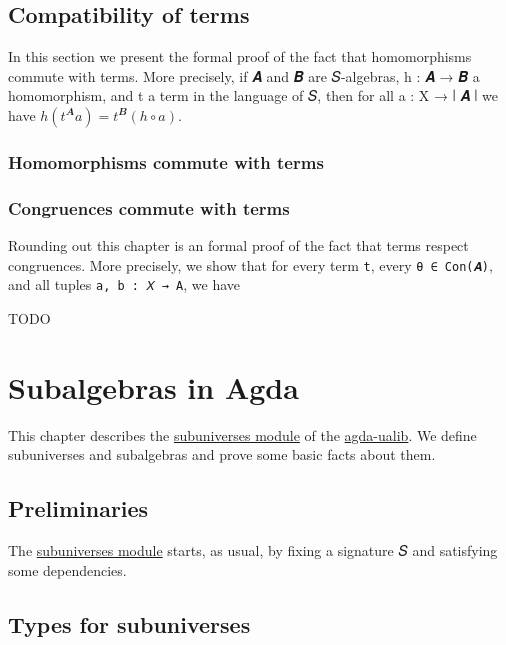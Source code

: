 \documentclass[sigplan,screen]{acmart}
\newcommand{\agdaualib}{\href{https://ualib.org}{agda-ualib}\xspace}
\newcommand\subuniversesmodule{\href{https://gitlab.com/ualib/ualib.gitlab.io/-/blob/master/subuniverses.lagda.rst}{subuniverses module}\xspace}
\begin{document}
\subsection{Compatibility of terms}\label{compatibility-of-terms}
In this section we present the formal proof of the fact that homomorphisms commute with terms. More precisely, if 𝑨 and 𝑩 are 𝑆-algebras, h : 𝑨 → 𝑩 a homomorphism, and t a term in the language of 𝑆, then for all a : X → ∣ 𝑨 ∣ we have \(h (t^{𝑨} a) = t^{𝑩} (h ∘ a)\).

\subsubsection{Homomorphisms commute with terms}\label{homomorphisms-commute-with-terms}
\begin{code}\end{code}

\subsubsection{Congruences commute with terms}\label{congruences-commute-with-terms}
Rounding out this chapter is an formal proof of the fact that terms respect congruences. More precisely, we show that for every term \texttt{t}, every \texttt{θ\ ∈\ Con(𝑨)}, and all tuples \texttt{a,\ b\ :\ 𝑋\ →\ A}, we have

TODO

\section{Subalgebras in Agda}\label{subalgebras-in-agda}
This chapter describes the \subuniversesmodule of the \agdaualib. We define subuniverses and subalgebras and prove some basic facts about them.

\subsection{Preliminaries}\label{preliminaries}
The \subuniversesmodule starts, as usual, by fixing a signature 𝑆 and satisfying some dependencies.

\subsection{Types for subuniverses}\label{types-for-subuniverses}
\begin{code}\end{code}
\end{document}
